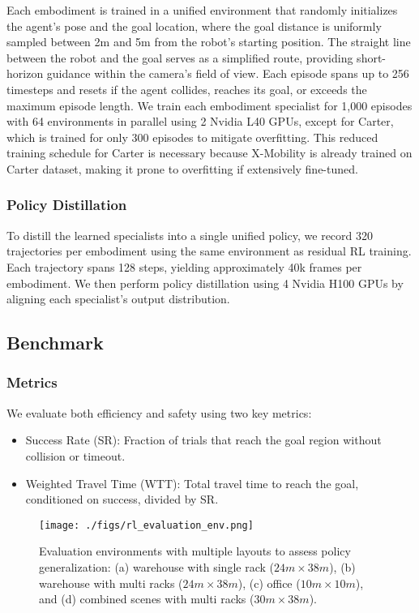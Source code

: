 \documentclass[letterpaper, 10 pt,conference]{ieeeconf}
\begin{document}
Each embodiment is trained in a unified environment that randomly initializes the agent’s pose and the goal location, where the goal distance is uniformly sampled between 2m and 5m from the robot’s starting position. The straight line between the robot and the goal serves as a simplified route, providing short-horizon guidance within the camera’s field of view. Each episode spans up to 256 timesteps and resets if the agent collides, reaches its goal, or exceeds the maximum episode length. We train each embodiment specialist for 1,000 episodes with 64 environments in parallel using 2 Nvidia L40 GPUs, except for Carter, which is trained for only 300 episodes to mitigate overfitting. This reduced training schedule for Carter is necessary because X-Mobility is already trained on Carter dataset, making it prone to overfitting if extensively fine-tuned.

\subsubsection{Policy Distillation} To distill the learned specialists into a single unified policy, we record 320 trajectories per embodiment using the same environment as residual RL training. Each trajectory spans 128 steps, yielding approximately 40k frames per embodiment. We then perform policy distillation using 4 Nvidia H100 GPUs by aligning each specialist’s output distribution.

\subsection{Benchmark}

\subsubsection{Metrics} We evaluate both efficiency and safety using two key metrics: 
\begin{itemize} 
    \item Success Rate (SR): Fraction of trials that reach the goal region without collision or timeout. 
    \item Weighted Travel Time (WTT): Total travel time to reach the goal, conditioned on success, divided by SR. 
\end{itemize}

\begin{figure}[t] 
\begin{center} \centering\texttt{[image: ./figs/rl\_evaluation\_env.png]} 
\caption{Evaluation environments with multiple layouts to assess policy generalization: (a) warehouse with single rack ($24m\times38 m$), (b) warehouse with multi racks ($24m\times38 m$), (c) office ($10m\times10 m$), and (d) combined scenes with multi racks ($30m\times 38 m$).} 
\label{fig:rl_evaluation_env} 
\end{center} 
\end{figure}
\end{document}
